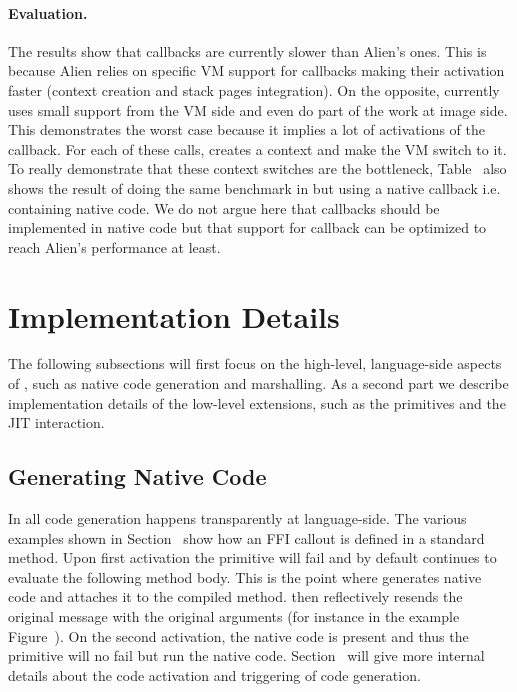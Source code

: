 \paragraph{Evaluation.}
The results show that \NB callbacks are currently slower than Alien's ones.
This is because Alien relies on specific VM support for callbacks making their activation faster (context creation and stack pages integration).
On the opposite, \NB currently uses small support from the VM side and even do part of the work at image side.
This  demonstrates the worst case because it implies a lot of activations of the callback.
For each of these calls, \NB creates a context and make the VM switch to it.
To really demonstrate that these context switches are the bottleneck, Table~ also shows the result of doing the same benchmark in \NB but using a native callback i.e. containing native code.
We do not argue here that callbacks should be implemented in native code but that \NB support for callback can be optimized to reach Alien's performance at least.

\section{\NBFFI Implementation Details}

The following subsections will first focus on the high-level, language-side aspects of \NB, such as native code generation and marshalling.
As a second part we describe implementation details of the low-level extensions, such as the \NB primitives and the JIT interaction.

\subsection{Generating Native Code}

In \NB all code generation happens transparently at language-side.
The various examples shown in Section~ show how an FFI callout is defined in a standard method.
Upon first activation the \NB primitive will fail and by default continues to evaluate the following method body.
This is the point where \NB generates native code and attaches it to the compiled method.
\NB then reflectively resends the original message with the original arguments (for instance  in the example Figure~).
On the second activation, the native code is present and thus the primitive will no fail but run the native code.
Section~ will give more internal details about the code activation and triggering of code generation.

